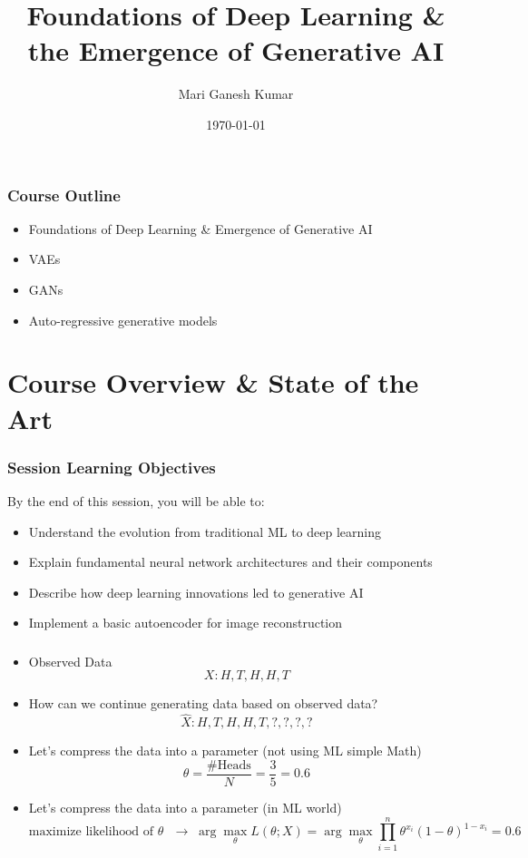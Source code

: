 \documentclass[5pt,aspectratio=169]{beamer}
\title{Foundations of Deep Learning \& the Emergence of Generative AI}
\author{Mari Ganesh Kumar}
\date{\today}
\begin{document}
\begin{frame}
\titlepage
\end{frame}




\begin{frame}
\frametitle{Course Outline}
\begin{itemize}
    \item Foundations of Deep Learning \& Emergence of Generative AI
    \item VAEs
    \item GANs
    \item Auto-regressive generative models
\end{itemize}
\end{frame}

\section{Course Overview \& State of the Art}




\begin{frame}
\frametitle{Session Learning Objectives}
By the end of this session, you will be able to:
\begin{itemize}
    \item Understand the evolution from traditional ML to deep learning
    \item Explain fundamental neural network architectures and their components
    \item Describe how deep learning innovations led to generative AI
    \item Implement a basic autoencoder for image reconstruction
\end{itemize}
\end{frame}

\begin{frame}
\frametitle{%
  }

\begin{itemize}
\item<4-> Observed Data
\[
X: H, T, H, H, T
\]
\item<5-> How can we continue generating data based on observed data?
\[
\hat{X}: H, T, H, H, T, ?, ?, ?, ?
\]
\item<6-> Let's compress the data into a parameter (not using ML simple Math)
\[
\theta = \frac{\#\text{Heads}}{N} = \frac{3}{5} = 0.6
\]
\item<7-> Let's compress the data into a parameter (in ML world)
\[
\text{maximize likelihood of $\theta $  } \rightarrow \; \arg\max_{\theta}L(\theta; X) = \arg\max_{\theta}\prod_{i=1}^{n} \theta^{x_i}(1-\theta)^{1-x_i} = 0.6
\]
\end{itemize}
\end{frame}
\end{document}

